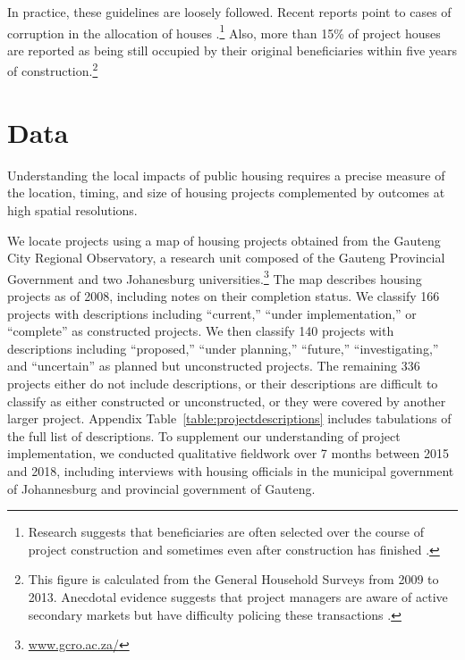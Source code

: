\documentclass[12pt]{article}
\begin{document}
In practice, these guidelines are loosely followed.  Recent reports point to cases of corruption in the allocation of houses \citep{seriq}.\footnote{Research suggests that beneficiaries are often selected over the course of project construction and sometimes even after construction has finished \citep{seriq}.}  Also, more than 15\% of project houses are reported as being still occupied by their original beneficiaries within five years of construction.\footnote{This figure is calculated from the General Household Surveys from 2009 to 2013. Anecdotal evidence suggests that project managers are aware of active secondary markets but have difficulty policing these transactions \citep{resale}.} 




\section{Data}\label{section:data}

Understanding the local impacts of public housing requires a precise measure of the location, timing, and size of housing projects complemented by outcomes at high spatial resolutions.

We locate projects using a map of housing projects obtained from the Gauteng City Regional Observatory, a research unit composed of the Gauteng Provincial Government and two Johanesburg universities.\footnote{\href{url}{www.gcro.ac.za/}}  The map describes housing projects as of 2008, including notes on their completion status.  We classify 166 projects with descriptions including ``current,'' ``under implementation,'' or ``complete'' as constructed projects.  We then classify 140 projects with descriptions including ``proposed,'' ``under planning,'' ``future,'' ``investigating,'' and ``uncertain'' as planned but unconstructed projects.  The remaining 336 projects either do not include descriptions, or their descriptions are difficult to classify as either constructed or unconstructed, or they were covered by another larger project.  Appendix Table~\ref{table:projectdescriptions} includes tabulations of the full list of descriptions.  To supplement our understanding of project implementation, we conducted qualitative fieldwork over 7 months between 2015 and 2018, including interviews with housing officials in the municipal government of Johannesburg and provincial government of Gauteng. 

\end{document}
